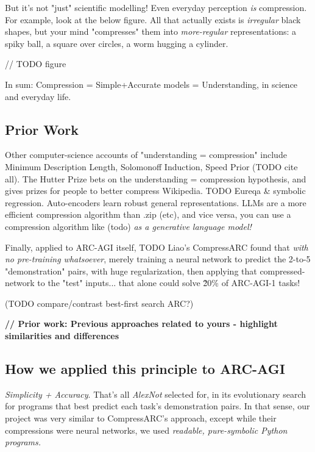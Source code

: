 \documentclass{article}
\begin{document}
But it's not "just" scientific modelling! Even everyday perception \textit{is} compression. For example, look at the below figure. All that actually exists is \textit{irregular} black shapes, but your mind "compresses" them into \textit{more-regular} representations: a spiky ball, a square over circles, a worm hugging a cylinder.

// TODO figure

In sum: Compression = Simple+Accurate models = Understanding, in science and everyday life.

\subsection{Prior Work}

Other computer-science accounts of "understanding = compression" include Minimum Description Length, Solomonoff Induction, Speed Prior (TODO cite all). The Hutter Prize bets on the understanding = compression hypothesis, and gives prizes for people to better compress Wikipedia. TODO Eureqa \& symbolic regression. Auto-encoders learn robust general representations. LLMs are a more efficient compression algorithm than .zip (etc), and vice versa, you can use a compression algorithm like (todo) \textit{as a generative language model!}

Finally, applied to ARC-AGI itself, TODO Liao's CompressARC found that \textit{with no pre-training whatsoever}, merely training a neural network to predict the 2-to-5 "demonstration" pairs, with huge regularization, then applying that compressed-network to the "test" inputs... that alone could solve \~20\% of ARC-AGI-1 tasks!

(TODO compare/contrast best-first search ARC?)

\textbf{// Prior work: Previous approaches related to yours - highlight similarities and differences}

\subsection{How we applied this principle to ARC-AGI }

\textit{Simplicity + Accuracy}. That's all \textit{AlexNot} selected for, in its evolutionary search for programs that best predict each task's demonstration pairs. In that sense, our project was very similar to CompressARC's approach, except while their compressions were neural networks, we used \textit{readable, pure-symbolic Python programs.} 
\end{document}

